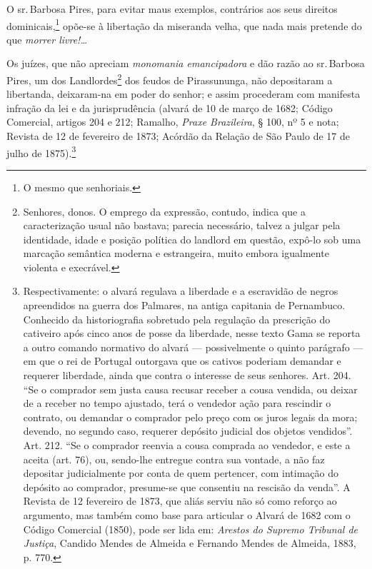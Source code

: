 O sr.\,Barbosa Pires, para evitar maus exemplos, contrários aos seus
direitos dominicais,\footnote{O mesmo que senhoriais.} opõe-se à
libertação da miseranda velha, que nada mais pretende do que
\emph{morrer livre!\ldots{}}

Os juízes, que não apreciam \emph{monomania emancipadora} e dão razão ao
sr.\,Barbosa Pires, um dos Landlordes\footnote{Senhores, donos. O
  emprego da expressão, contudo, indica que a caracterização usual não
  bastava; parecia necessário, talvez a julgar pela identidade, idade e
  posição política do landlord em questão, expô-lo sob uma marcação
  semântica moderna e estrangeira, muito embora igualmente violenta e
  execrável.} dos feudos de Pirassununga, não depositaram a libertanda,
deixaram-na em poder do senhor; e assim procederam com manifesta
infração da lei e da jurisprudência (alvará de 10 de março de 1682;
Código Comercial, artigos 204 e 212; Ramalho, \emph{Praxe Brazileira}, §
100, nº 5 e nota; Revista de 12 de fevereiro de 1873; Acórdão da Relação
de São Paulo de 17 de julho de 1875).\footnote{Respectivamente: o
  alvará regulava a liberdade e a escravidão de negros apreendidos na
  guerra dos Palmares, na antiga capitania de Pernambuco. Conhecido da
  historiografia sobretudo pela regulação da prescrição do cativeiro
  após cinco anos de posse da liberdade, nesse texto Gama se reporta a
  outro comando normativo do alvará --- possivelmente o quinto parágrafo
  --- em que o rei de Portugal outorgava que os cativos poderiam demandar
  e requerer liberdade, ainda que contra o interesse de seus senhores.
  Art. 204. ``Se o comprador sem justa causa recusar receber a cousa
  vendida, ou deixar de a receber no tempo ajustado, terá o vendedor
  ação para rescindir o contrato, ou demandar o comprador pelo preço com
  os juros legais da mora; devendo, no segundo caso, requerer depósito
  judicial dos objetos vendidos''. Art. 212. ``Se o comprador reenvia a
  cousa comprada ao vendedor, e este a aceita (art. 76), ou, sendo-lhe
  entregue contra sua vontade, a não faz depositar judicialmente por
  conta de quem pertencer, com intimação do depósito ao comprador,
  presume-se que consentiu na rescisão da venda''. A Revista de 12
  fevereiro de 1873, que aliás serviu não só como reforço ao argumento,
  mas também como base para articular o Alvará de 1682 com o Código
  Comercial (1850), pode ser lida em: \emph{Arestos do Supremo
  Tribunal de Justiça}, Candido Mendes de Almeida e Fernando Mendes de
  Almeida, 1883, p. 770.}

